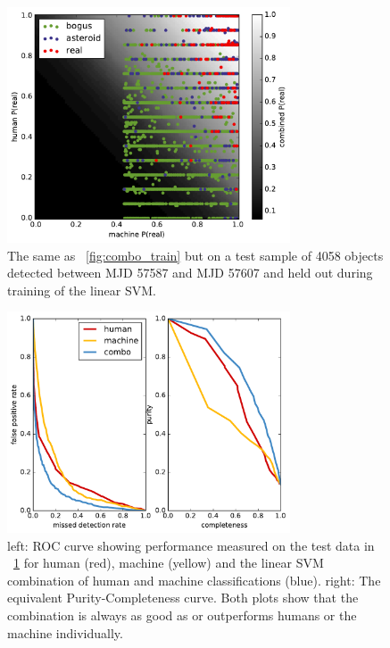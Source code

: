 \documentclass[a4paper,fleqn,usenatbib]{mnras}
\begin{document}
\begin{figure}
   \includegraphics[width=84mm]{figs/human_v_machine_test.pdf}
   \caption{The same as ~\ref{fig:combo_train} but on a test sample of 4058 objects detected between
            MJD 57587 and MJD 57607 and held out during training of the linear SVM.} 
   \label{fig:combo_test} 
\end{figure}

\begin{figure}
   \includegraphics[width=84mm]{figs/roc.pdf}
   \caption{left: ROC curve showing performance measured on the test data in ~\ref{fig:combo_test} for human (red), machine (yellow) and
            the linear SVM combination of human and machine classifications (blue).  right: The equivalent Purity-Completeness curve.  Both
            plots show that the combination is always as good as or outperforms humans or the machine individually.} 
   \label{fig:roc} 
\end{figure}

\bsp	%
\label{lastpage}
\end{document}

